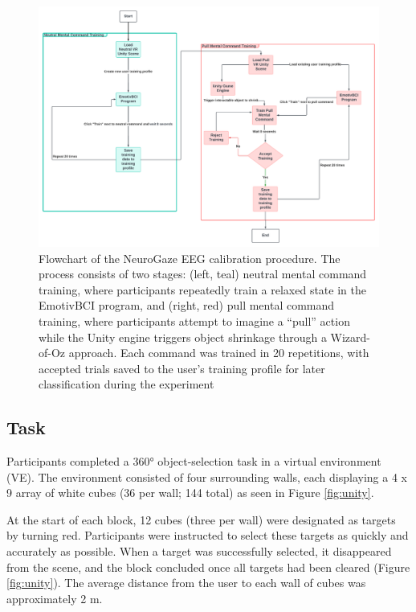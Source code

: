 \documentclass[utf8]{FrontiersinHarvard} %
\begin{document}
\begin{figure}[ht]
\begin{center}
\includegraphics[width=17cm]{figures/flowchart_for_training.png}
\end{center}
\caption{Flowchart of the NeuroGaze EEG calibration procedure. The process consists of two stages: (left, teal) neutral mental command training, where participants repeatedly train a relaxed state in the EmotivBCI program, and (right, red) pull mental command training, where participants attempt to imagine a “pull” action while the Unity engine triggers object shrinkage through a Wizard-of-Oz approach. Each command was trained in 20 repetitions, with accepted trials saved to the user's training profile for later classification during the experiment}\label{fig:training-flowchart}
\end{figure}

\subsection{Task}
Participants completed a 360° object-selection task in a virtual environment (VE). The environment consisted of four surrounding walls, each displaying a 4 x 9 array of white cubes (36 per wall; 144 total) as seen in Figure \ref{fig:unity}. 

At the start of each block, 12 cubes (three per wall) were designated as targets by turning red. Participants were instructed to select these targets as quickly and accurately as possible. When a target was successfully selected, it disappeared from the scene, and the block concluded once all targets had been cleared (Figure \ref{fig:unity}). The average distance from the user to each wall of cubes was approximately 2 m.
\end{document}
